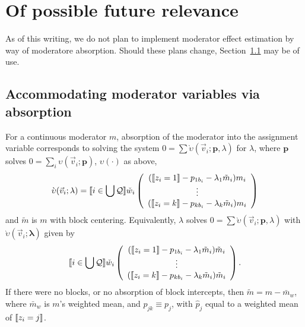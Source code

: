 \documentclass{article}
\DeclarePairedDelimiter{\indicator}{\llbracket}{\rrbracket}
\newcommand{\owt}[1][{[z_{i}]}]{\ensuremath{\check{w}_{i#1}}}
\newcommand{\absorbInterceptsEF}{\upsilon}
\newcommand{\absorbModeratorEF}{\grave{\upsilon}}
\begin{document}
\section{Of possible future relevance}

As of this writing, we do not plan to implement moderator effect estimation by way of moderatore absorption.  Should these plans change, Section~\ref{sec:accomm-moder-vari} may be of use.
\subsection{Accommodating moderator variables via absorption}
\label{sec:accomm-moder-vari}


For a continuous moderator $m$, absorption of the moderator into the assignment variable
corresponds to solving the system $0 = \sum
\absorbModeratorEF(\vec{v}_{i}; \mathbf{p},{\lambda})$ for
$\lambda$, where $\mathbf{p}$ solves $0 =
\sum_{i}\absorbInterceptsEF(\vec{v}_{i}; \mathbf{p})$,
$\absorbInterceptsEF(\cdot)$ as above,
\begin{equation}
  \label{eq:18}
    \absorbModeratorEF(\vec{v}_{i}; \mathbf{\lambda})=
    \indicator{i \in \bigcup \mathcal{Q}} \owt[]
     \left(
       \begin{array}{c}
         (
         \indicator{z_{i}=1}-p_{1b_{i}}-\lambda_{1}
         \tilde{m}_{i}
         )m_{i} \\
         \vdots\\
         (\indicator{z_{i}=k}-p_{kb_{i}}
         - \lambda_{k} \tilde{m}_{i})m_{i}\\
       \end{array}
  \right)%
\end{equation}
and $\tilde{m}$ is $m$ with block centering. Equivalently, $\lambda$
solves $0 = \sum
\absorbModeratorEF(\vec{v}_{i}; \mathbf{p},{\lambda})$ with
$\absorbModeratorEF(\vec{v}_{i}; \mathbf{\lambda})$ given by
\begin{equation*}
    \indicator{i \in \bigcup \mathcal{Q}} \owt[]
     \left(
       \begin{array}{c}
         (\indicator{z_{i}=1}-p_{1b_{i}}-\lambda_{1}
         \tilde{m}_{i})\tilde{m}_{i} \\
         \vdots\\
         (\indicator{z_{i}=k}-p_{kb_{i}}
         - \lambda_{k} \tilde{m}_{i})\tilde{m}_{i}\\
       \end{array}
     \right).
\end{equation*}
If there were no blocks,
or no absorption of block intercepts, then $\tilde{m} = m -
\bar{m}_{w}$,  where $\bar{m}_{w}$ is $m$'s weighted mean, and $p_{jk}
\equiv p_{j}$, with $\hat{p}_{j}$ equal to a weighted mean of
$\indicator{z_{i}=j}$.
\end{document}
